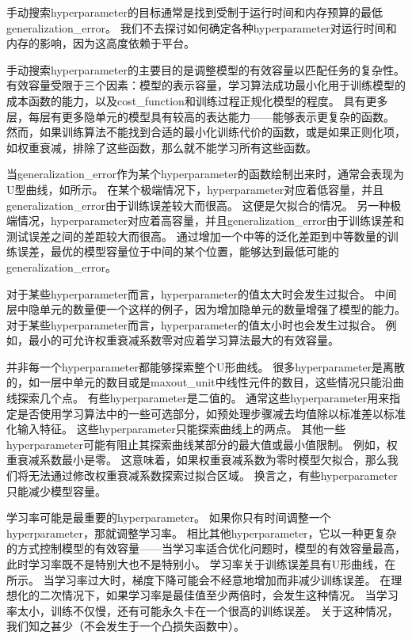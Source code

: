 手动搜索\gls{hyperparameter}的目标通常是找到受制于运行时间和内存预算的最低\gls{generalization_error}。
我们不去探讨如何确定各种\gls{hyperparameter}对运行时间和内存的影响，因为这高度依赖于平台。

手动搜索\gls{hyperparameter}的主要目的是调整模型的有效容量以匹配任务的复杂性。
有效容量受限于三个因素：模型的表示容量，学习算法成功最小化用于训练模型的成本函数的能力，以及\gls{cost_function}和训练过程正规化模型的程度。
具有更多层，每层有更多隐单元的模型具有较高的表达能力——能够表示更复杂的函数。
然而，如果训练算法不能找到合适的最小化训练代价的函数，或是如果正则化项，如权重衰减，排除了这些函数，那么就不能学习所有这些函数。

当\gls{generalization_error}作为某个\gls{hyperparameter}的函数绘制出来时，通常会表现为U型曲线，如所示。
在某个极端情况下，\gls{hyperparameter}对应着低容量，并且\gls{generalization_error}由于训练误差较大而很高。
这便是欠拟合的情况。
另一种极端情况，\gls{hyperparameter}对应着高容量，并且\gls{generalization_error}由于训练误差和测试误差之间的差距较大而很高。
通过增加一个中等的泛化差距到中等数量的训练误差，最优的模型容量位于中间的某个位置，能够达到最低可能的\gls{generalization_error}。


对于某些\gls{hyperparameter}而言，\gls{hyperparameter}的值太大时会发生过拟合。
中间层中隐单元的数量便一个这样的例子，因为增加隐单元的数量增强了模型的能力。
对于某些\gls{hyperparameter}而言，\gls{hyperparameter}的值太小时也会发生过拟合。
例如，最小的可允许权重衰减系数零对应着学习算法最大的有效容量。

并非每一个\gls{hyperparameter}都能够探索整个U形曲线。
很多\gls{hyperparameter}是离散的，如一层中单元的数目或是\gls{maxout_unit}中线性元件的数目，这些情况只能沿曲线探索几个点。
有些\gls{hyperparameter}是二值的。
通常这些\gls{hyperparameter}用来指定是否使用学习算法中的一些可选部分，如预处理步骤减去均值除以标准差以标准化输入特征。
这些\gls{hyperparameter}只能探索曲线上的两点。
其他一些\gls{hyperparameter}可能有阻止其探索曲线某部分的最大值或最小值限制。
例如，权重衰减系数最小是零。
这意味着，如果权重衰减系数为零时模型欠拟合，那么我们将无法通过修改权重衰减系数探索过拟合区域。
换言之，有些\gls{hyperparameter}只能减少模型容量。

学习率可能是最重要的\gls{hyperparameter}。
如果你只有时间调整一个\gls{hyperparameter}，那就调整学习率。
相比其他\gls{hyperparameter}，它以一种更复杂的方式控制模型的有效容量——当学习率适合优化问题时，模型的有效容量最高，此时学习率既不是特别大也不是特别小。
学习率关于训练误差具有U形曲线，在所示。
当学习率过大时，梯度下降可能会不经意地增加而非减少训练误差。
在理想化的二次情况下，如果学习率是最佳值至少两倍时，会发生这种情况\citep{LeCun+98backprop-small}。
当学习率太小，训练不仅慢，还有可能永久卡在一个很高的训练误差。
关于这种情况，我们知之甚少（不会发生于一个凸损失函数中）。

